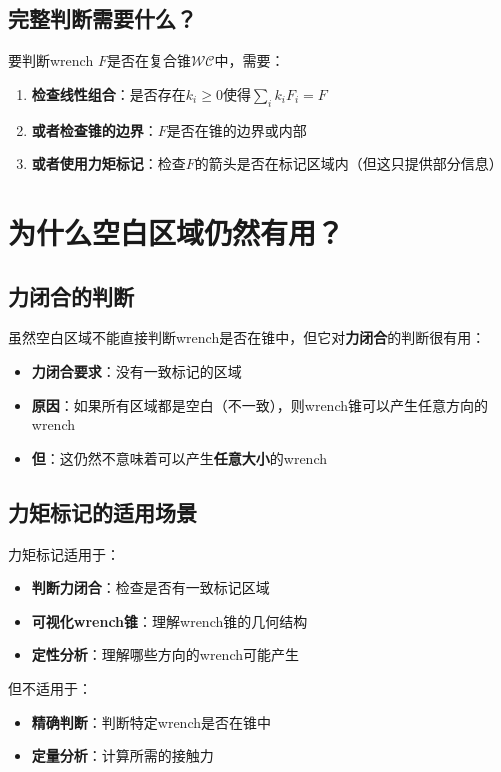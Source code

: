 \documentclass[12pt,a4paper]{article}
\begin{document}
\subsection{完整判断需要什么？}

要判断wrench $F$是否在复合锥$\mathcal{WC}$中，需要：

\begin{enumerate}
    \item \textbf{检查线性组合}：是否存在$k_i \geq 0$使得$\sum_i k_i F_i = F$
    \item \textbf{或者检查锥的边界}：$F$是否在锥的边界或内部
    \item \textbf{或者使用力矩标记}：检查$F$的箭头是否在标记区域内（但这只提供部分信息）
\end{enumerate}

\section{为什么空白区域仍然有用？}

\subsection{力闭合的判断}

虽然空白区域不能直接判断wrench是否在锥中，但它对\textbf{力闭合}的判断很有用：

\begin{itemize}
    \item \textbf{力闭合要求}：没有一致标记的区域
    \item \textbf{原因}：如果所有区域都是空白（不一致），则wrench锥可以产生任意方向的wrench
    \item \textbf{但}：这仍然不意味着可以产生\textbf{任意大小}的wrench
\end{itemize}

\subsection{力矩标记的适用场景}

力矩标记适用于：
\begin{itemize}
    \item \textbf{判断力闭合}：检查是否有一致标记区域
    \item \textbf{可视化wrench锥}：理解wrench锥的几何结构
    \item \textbf{定性分析}：理解哪些方向的wrench可能产生
\end{itemize}

但不适用于：
\begin{itemize}
    \item \textbf{精确判断}：判断特定wrench是否在锥中
    \item \textbf{定量分析}：计算所需的接触力
\end{itemize}
\end{document}

